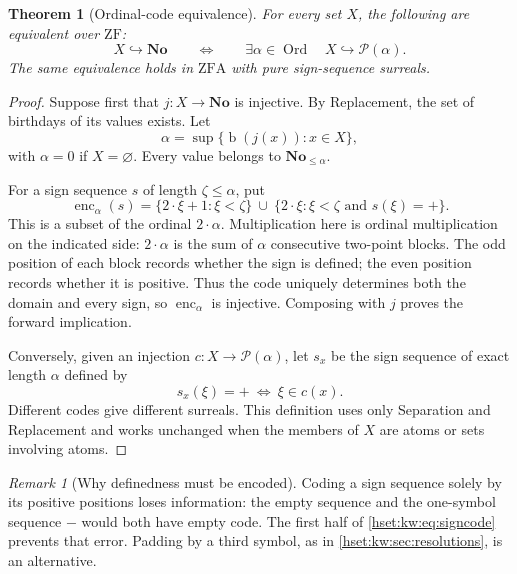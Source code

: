 \documentclass[11pt,letterpaper]{article}
\newtheorem{theorem}{Theorem}[section]
\theoremstyle{definition}
\theoremstyle{remark}
\newtheorem{remark}[remark]{Remark}\aliascntresetthe{remark}
\newcommand{\No}{\mathbf{No}}
\newcommand{\Ord}{\operatorname{Ord}}
\newcommand{\bd}{\operatorname{b}}
\newcommand{\Pow}{\mathcal P}
\newcommand{\ZF}{\mathrm{ZF}}
\newcommand{\ZFA}{\mathrm{ZFA}}
\begin{document}
\begin{theorem}[Ordinal-code equivalence]\label{hset:kw:thm:coding}
For every set $X$, the following are equivalent over $\ZF$:
\[
X\hookrightarrow\No
\qquad\Longleftrightarrow\qquad
\exists\alpha\in\Ord\quad X\hookrightarrow\Pow(\alpha).
\]
The same equivalence holds in $\ZFA$ with pure sign-sequence surreals.
\end{theorem}
\begin{proof}
Suppose first that $j:X\to\No$ is injective. By Replacement, the set of birthdays of its values exists. Let
\[
\alpha=\sup\{\bd(j(x)):x\in X\},
\]
with $\alpha=0$ if $X=\varnothing$. Every value belongs to $\No_{\le\alpha}$.

For a sign sequence $s$ of length $\zeta\le\alpha$, put
\begin{equation}\label{hset:kw:eq:signcode}
\operatorname{enc}_\alpha(s)=
\{2\cdot\xi+1:\xi<\zeta\}
\ \cup\
\{2\cdot\xi:\xi<\zeta\text{ and }s(\xi)=+\}.
\end{equation}
This is a subset of the ordinal $2\cdot\alpha$. Multiplication here is ordinal multiplication on the indicated side: $2\cdot\alpha$ is the sum of $\alpha$ consecutive two-point blocks. The odd position of each block records whether the sign is defined; the even position records whether it is positive. Thus the code uniquely determines both the domain and every sign, so $\operatorname{enc}_\alpha$ is injective. Composing with $j$ proves the forward implication.

Conversely, given an injection $c:X\to\Pow(\alpha)$, let $s_x$ be the sign sequence of exact length $\alpha$ defined by
\[
s_x(\xi)=+\ \Longleftrightarrow\ \xi\in c(x).
\]
Different codes give different surreals. This definition uses only Separation and Replacement and works unchanged when the members of $X$ are atoms or sets involving atoms.
\end{proof}

\begin{remark}[Why definedness must be encoded]
Coding a sign sequence solely by its positive positions loses information: the empty sequence and the one-symbol sequence $-$ would both have empty code. The first half of \eqref{hset:kw:eq:signcode} prevents that error. Padding by a third symbol, as in \cref{hset:kw:sec:resolutions}, is an alternative.
\end{remark}
\end{document}
